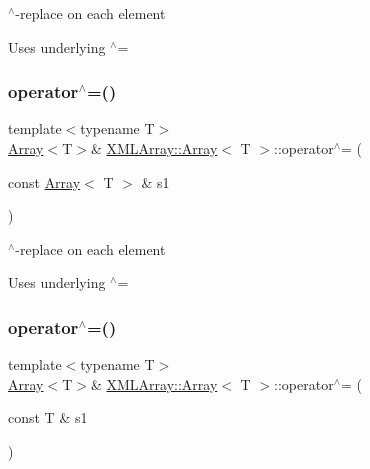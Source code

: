 $^\wedge$-\/replace on each element 

Uses underlying $^\wedge$= \mbox{\label{classXMLArray_1_1Array_a8e2621caf3277b85e6898a3eceb9b233}} 
\subsubsection{\texorpdfstring{operator$^\wedge$=()}{operator^=()}\hspace{0.1cm}{\footnotesize\ttfamily [2/4]}}
{\footnotesize\ttfamily template$<$typename T$>$ \\
\mbox{\hyperlink{classXMLArray_1_1Array}{Array}}$<$T$>$\& \mbox{\hyperlink{classXMLArray_1_1Array}{X\+M\+L\+Array\+::\+Array}}$<$ T $>$\+::operator$^\wedge$= (\begin{DoxyParamCaption}\item[{const \mbox{\hyperlink{classXMLArray_1_1Array}{Array}}$<$ T $>$ \&}]{s1 }\end{DoxyParamCaption})\hspace{0.3cm}{\ttfamily [inline]}}



$^\wedge$-\/replace on each element 

Uses underlying $^\wedge$= \mbox{\label{classXMLArray_1_1Array_ac68e4b59911e762c271c90a6aa81e0c3}} 
\subsubsection{\texorpdfstring{operator$^\wedge$=()}{operator^=()}\hspace{0.1cm}{\footnotesize\ttfamily [3/4]}}
{\footnotesize\ttfamily template$<$typename T$>$ \\
\mbox{\hyperlink{classXMLArray_1_1Array}{Array}}$<$T$>$\& \mbox{\hyperlink{classXMLArray_1_1Array}{X\+M\+L\+Array\+::\+Array}}$<$ T $>$\+::operator$^\wedge$= (\begin{DoxyParamCaption}\item[{const T \&}]{s1 }\end{DoxyParamCaption})\hspace{0.3cm}{\ttfamily [inline]}}



